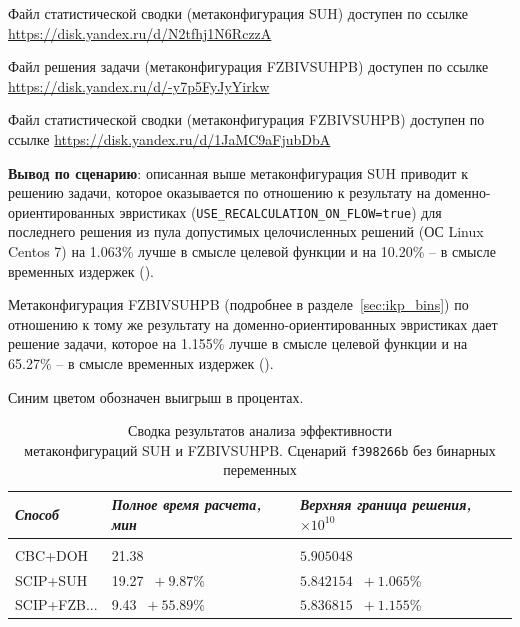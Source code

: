 \documentclass[%
	11pt,
	a4paper,
	utf8,
		]{article}
\begin{document}
Файл статистической сводки (метаконфигурация SUH) доступен по ссылке \url{https://disk.yandex.ru/d/N2tfhj1N6RczzA}

Файл решения задачи (метаконфигурация FZBIVSUHPB) доступен по ссылке \url{https://disk.yandex.ru/d/-y7p5FyJyYirkw}

Файл статистической сводки (метаконфигурация FZBIVSUHPB) доступен по ссылке \url{https://disk.yandex.ru/d/1JaMC9aFjubDbA}

\vspace*{3mm}
\textbf{Вывод по сценарию}: описанная выше метаконфигурация SUH приводит к решению задачи, которое оказывается по отношению к результату на доменно-ориентированных эвристиках (\verb|USE_RECALCULATION_ON_FLOW=true|) для последнего решения из пула допустимых целочисленных решений (ОС Linux Centos 7) на 1.063\% лучше в смысле целевой функции и на 10.20\% -- в смысле временных издержек (). 

Метаконфигурация FZBIVSUHPB (подробнее в разделе~\ref{sec:ikp_bins}) по отношению к тому же результату на доменно-ориентированных эвристиках дает решение задачи, которое на 1.155\% лучше в смысле целевой функции и на 65.27\% -- в смысле временных издержек ().

Синим цветом обозначен выигрыш в процентах.

{
	\begin{table}[!h]
		\centering
		\caption{Сводка результатов анализа эффективности \\метаконфигураций SUH и FZBIVSUHPB. Сценарий \texttt{f398266b} без бинарных переменных}
		\begin{tabular}{ p{2.5cm} p{3.3cm} p{3.4cm} }
			\emph{Способ} & \emph{Полное время расчета, мин} & \emph{Верхняя граница решения, $ \times 10^{10} $} \\
			\hline\hline\\[-3.5mm]
			{CBC+DOH} & 21.38 & $ 5.905048 $ \\
			\hline
			SCIP+SUH & 19.27 {\color{blue} $\ +9.87 $\%} & $ 5.842154 $ {\color{blue} $\ +1.065 $\%} \\
			\hline
			SCIP+FZB... & 9.43 {\color{blue} $\ +55.89 $\%} & $ 5.836815 $ {\color{blue} $\ +1.155 $\%} \\
		\end{tabular}\label{tab:f398266b_wo_bins}
	\end{table}
}
\end{document}
